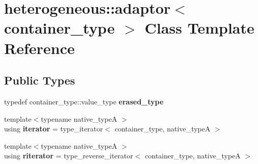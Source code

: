 \hypertarget{classheterogeneous_1_1adaptor}{}\section{heterogeneous\+:\+:adaptor$<$ container\+\_\+type $>$ Class Template Reference}
\label{classheterogeneous_1_1adaptor}
\subsection*{Public Types}
\begin{DoxyCompactItemize}
\item 
\hypertarget{classheterogeneous_1_1adaptor_a74d9c3ff7594935a12ccb50c28a5fe44}{}typedef container\+\_\+type\+::value\+\_\+type {\bfseries erased\+\_\+type}\label{classheterogeneous_1_1adaptor_a74d9c3ff7594935a12ccb50c28a5fe44}

\item 
\hypertarget{classheterogeneous_1_1adaptor_a5715cec1ac4cd00188578a81ae332b71}{}{\footnotesize template$<$typename native\+\_\+type\+A $>$ }\\using {\bfseries iterator} = type\+\_\+iterator$<$ container\+\_\+type, native\+\_\+type\+A $>$\label{classheterogeneous_1_1adaptor_a5715cec1ac4cd00188578a81ae332b71}

\item 
\hypertarget{classheterogeneous_1_1adaptor_a371a1ea723cdc9da4c0726fa113ca3f6}{}{\footnotesize template$<$typename native\+\_\+type\+A $>$ }\\using {\bfseries riterator} = type\+\_\+reverse\+\_\+iterator$<$ container\+\_\+type, native\+\_\+type\+A $>$\label{classheterogeneous_1_1adaptor_a371a1ea723cdc9da4c0726fa113ca3f6}

\end{DoxyCompactItemize}
